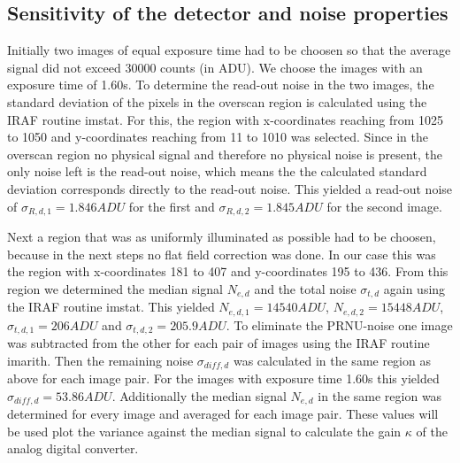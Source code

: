 \documentclass[12pt]{article}
\begin{document}
\subsection{Sensitivity of the detector and noise properties}
Initially two images of equal exposure time had to be choosen so that the average signal did not exceed 30000 counts (in ADU). We choose the images with an exposure time of 1.60s. To determine the read-out noise in the two images, the standard deviation of the pixels in the overscan region is calculated using the IRAF routine imstat. For this, the region with x-coordinates reaching from 1025 to 1050 and y-coordinates reaching from 11 to 1010 was selected. Since in the overscan region no physical signal and therefore no physical noise is present, the only noise left is the read-out noise, which means the the calculated standard deviation corresponds directly to the read-out noise. This yielded a read-out noise of $\sigma_{R,d,1}=1.846ADU$ for the first and $\sigma_{R,d,2}=1.845ADU$ for the second image.

Next a region that was as uniformly illuminated as possible had to be choosen, because in the next steps no flat field correction was done. In our case this was the region with x-coordinates 181 to 407 and y-coordinates 195 to 436. From this region we determined the median signal $N_{e,d}$ and the total noise $\sigma_{t,d}$ again using the IRAF routine imstat. This yielded $N_{e,d,1}=14540ADU$, $N_{e,d,2}=15448ADU$, $\sigma_{t,d,1}=206ADU$ and $\sigma_{t,d,2}=205.9ADU$. To eliminate the PRNU-noise one image was subtracted from the other for each pair of images using the IRAF routine imarith. Then the remaining noise $\sigma_{diff,d}$ was calculated in the same region as above for each image pair. For the images with exposure time 1.60s this yielded $\sigma_{diff,d}=53.86ADU$. Additionally the median signal $N_{e,d}$ in the same region was determined for every image and averaged for each image pair. These values will be used plot the variance against the median signal to calculate the gain $\kappa$ of the analog digital converter.
\end{document}
